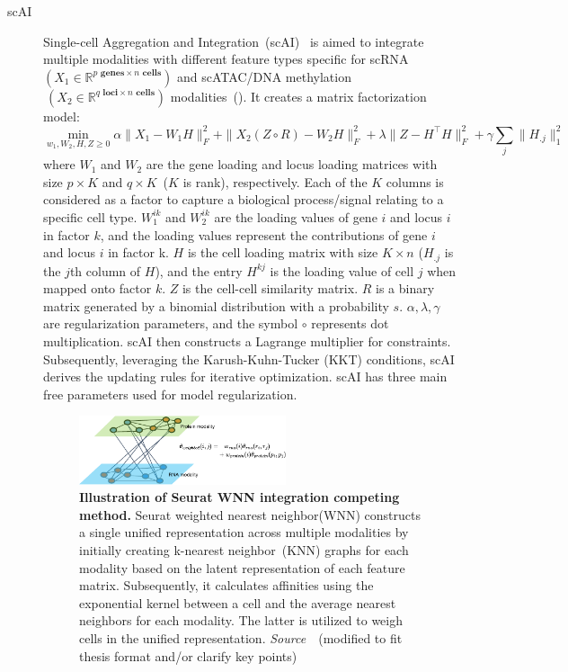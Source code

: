 \begin{description}
  \item[scAI]
  Single-cell Aggregation and Integration~(scAI)~\citep{jin2020scai} is aimed to integrate multiple modalities with different feature types specific for scRNA $(X_1\in \mathbb{R}^{p \textbf{ genes} \times n \textbf{ cells}})$ and scATAC/DNA methylation$~(X_2\in \mathbb{R}^{q \textbf{ loci}\times n \textbf{ cells}})$ modalities~(). It creates a matrix factorization model:
  \begin{equation}
  \min_{w_1,W_2,H,Z\geq 0} \alpha \|X_1-W_1H\|_F^2 + \|X_2(Z \circ R)-W_2H\|_F^2 + \lambda \|Z-H^\top H\|_F^2 + \gamma\sum_j \|H_{.j}\|_1^2
  \end{equation}
  where $W_1$ and $W_2$ are the gene loading and locus loading matrices with size $p\times K$ and $q\times K$~($K$ is rank), respectively. Each of the $K$ columns is considered as a factor to capture a biological process/signal relating to a specific cell type. $W_1^{ik}$ and $W_2^{ik}$ are the loading values of gene $i$ and locus $i$ in factor $k$, and the loading values represent the contributions of gene $i$ and locus $i$ in factor k. $H$ is the cell loading matrix with size $K\times n$ ($H_{.j}$ is the $j$th column of $H$), and the entry $H^{kj}$ is the loading value of cell $j$ when mapped onto factor $k$. $Z$ is the cell-cell similarity matrix. $R$ is a binary matrix generated by a binomial distribution with a probability $s$. $\alpha, \lambda, \gamma$ are regularization parameters, and the symbol $\circ$ represents dot multiplication. scAI then constructs a Lagrange multiplier for constraints. Subsequently, leveraging the Karush-Kuhn-Tucker (KKT) conditions, scAI derives the updating rules for iterative optimization. scAI has three main free parameters used for model regularization.

\begin{figure}[!h]
  	\centering
  	\includegraphics[width=0.60\textwidth]{Alg_WNN/fig}
  	\vspace{0.1cm}
  	\caption[Illustration of Seurat WNN integration competing method.]{\textbf{Illustration of Seurat WNN integration competing method.} Seurat weighted nearest neighbor(WNN) constructs a single unified representation across multiple modalities by initially creating k-nearest neighbor~(KNN) graphs for each modality based on the latent representation of each feature matrix. Subsequently, it calculates affinities using the exponential kernel between a cell and the average nearest neighbors for each modality. The latter is utilized to weigh cells in the unified representation. \emph{Source~\cite{hao2021seurat4}}~(modified to fit thesis format and/or clarify key points)
  }
  	\label{fig:Alg_WNN}
\end{figure}


\end{description}
